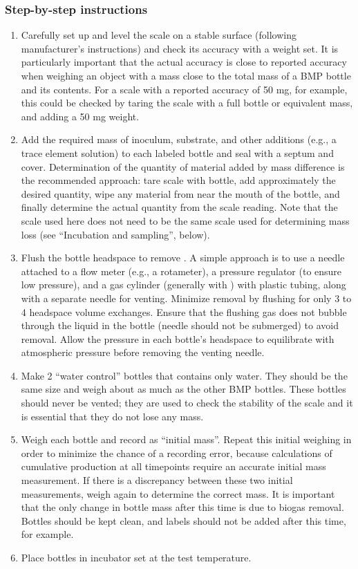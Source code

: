 \documentclass[]{article}
\begin{document}
\subsubsection{Step-by-step instructions}
\begin{enumerate}
  \item Carefully set up and level the scale on a stable surface (following manufacturer's instructions) and check its accuracy with a weight set. 
      It is particularly important that the actual accuracy is close to reported accuracy when weighing an object with a mass close to the total mass of a BMP bottle and its contents. 
      For a scale with a reported accuracy of 50 mg, for example, this could be checked by taring the scale with a full bottle or equivalent mass, and adding a 50 mg weight.
    \item Add the required mass of inoculum, substrate, and other additions (e.g., a trace element solution) to each labeled bottle and seal with a septum and cover. 
      Determination of the quantity of material added by mass difference is the recommended approach: tare scale with bottle, add approximately the desired quantity, wipe any material from near the mouth of the bottle, and finally determine the actual quantity from the scale reading. 
      Note that the scale used here does not need to be the same scale used for determining mass loss (see ``Incubation and sampling'', below).
    \item Flush the bottle headspace to remove . 
      A simple approach is to use a needle attached to a flow meter (e.g., a rotameter), a pressure regulator (to ensure low pressure), and a gas cylinder (generally with ) with plastic tubing, along with a separate needle for venting. 
      Minimize  removal by flushing for only 3 to 4 headspace volume exchanges. 
      Ensure that the flushing gas does not bubble through the liquid in the bottle (needle should not be submerged) to avoid  removal. 
      Allow the pressure in each bottle’s headspace to equilibrate with atmospheric pressure before removing the venting needle.
    \item Make 2 ``water control'' bottles that contains only water. 
      They should be the same size and weigh about as much as the other BMP bottles. 
      These bottles should never be vented; they are used to check the stability of the scale and it is essential that they do not lose any mass.
    \item Weigh each bottle and record as ``initial mass''. 
      Repeat this initial weighing in order to minimize the chance of a recording error, because calculations of cumulative  production at all timepoints require an accurate initial mass measurement.
      If there is a discrepancy between these two initial measurements, weigh again to determine the correct mass.
      It is important that the only change in bottle mass after this time is due to biogas removal.
      Bottles should be kept clean, and labels should not be added after this time, for example.
    \item Place bottles in incubator set at the test temperature.
\end{enumerate}
\end{document}

